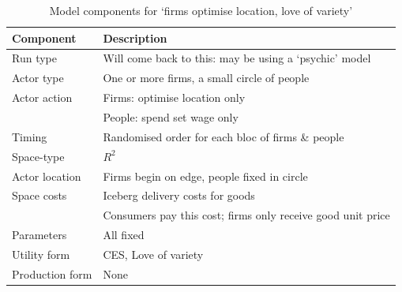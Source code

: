 \renewcommand{\arraystretch}{1.2}
\begin{table}[!hbt]
\begin{center}

\begin{tabular}{|l|l|}
\hline 
\textbf{Component} & \textbf{Description}\\
\hline
Run type & Will come back to this: may be using a `psychic' model\\
\hline
Actor type & One or more firms, a small circle of people\\
\hline
Actor action & Firms: optimise location only\\
& People: spend set wage only\\
\hline
Timing &
Randomised order for each bloc of firms \& people\\
\hline
Space-type &
$R^2$\\
\hline
Actor location & Firms begin on edge, people fixed in circle\\
\hline
Space costs & Iceberg delivery costs for goods\\
&Consumers pay this cost; firms only receive good unit price\\
\hline
Parameters & All fixed\\
\hline
Utility form & CES, Love of variety\\
\hline
Production form & None\\
\hline

\end{tabular}

\caption{Model components for `firms optimise location, love of variety' \label{tab:firmsLoV}}
\end{center}
\end{table}